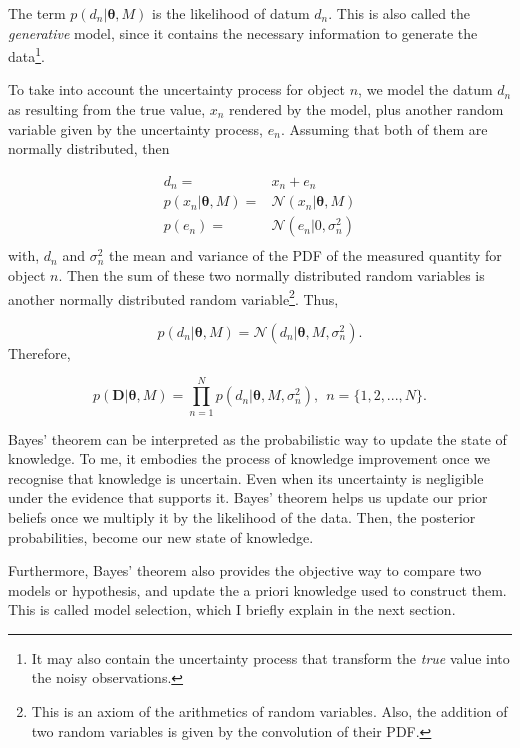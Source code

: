 The term $p(d_n|\mathbf{\theta},M)$ is the likelihood of datum $d_n$. This is also called the \emph{generative} model, since it contains the necessary information to generate the data\footnote{It may also contain the uncertainty process that transform the \emph{true} value into the noisy observations.}. 
{\color{red}
To take into account the uncertainty process for object $n$, we model the datum $d_n$ as resulting from the true value, $x_n$ rendered by the model, plus another random variable given by the uncertainty process, $e_n$. Assuming that both of them are normally distributed, then

\begin{align}
d_n = & x_n + e_n \nonumber \\
p(x_n|\mathbf{\theta},M)= &\mathcal{N}(x_n|\mathbf{\theta},M)\nonumber\\
p(e_n)= &\mathcal{N}(e_n|0,\sigma_n^2)\nonumber\\
\end{align}
with, $d_n$ and $\sigma_n^2$ the mean and variance of the PDF of the measured quantity for object $n$.
Then the sum of these two normally distributed random variables is another normally distributed random variable\footnote{This is an axiom of the arithmetics of random variables. Also, the addition of two random variables is given by the convolution of their PDF.}. Thus,

\begin{equation}
p(d_n|\mathbf{\theta},M) = \mathcal{N}(d_n|\mathbf{\theta},M,\sigma_n^2).
\end{equation}
Therefore,

\begin{equation}
p(\mathbf{D}|\mathbf{\theta},M) = \prod_{n=1}^N p(d_n|\mathbf{\theta},M,\sigma_n^2), \ \ n=\{1,2,...,N\}.
\end{equation}
}
Bayes' theorem can be interpreted as the probabilistic way to update the state of knowledge. To me, it embodies the process of knowledge improvement once we recognise that knowledge is uncertain. Even when its uncertainty is negligible under the evidence that supports it. Bayes' theorem helps us update our prior beliefs once we multiply it by the likelihood of the data. Then, the posterior probabilities, become our new state of knowledge. 

Furthermore, Bayes' theorem also provides the objective way to compare two models or hypothesis, and update the a priori knowledge used to construct them. This is called model selection, which I  briefly explain in the next section.

